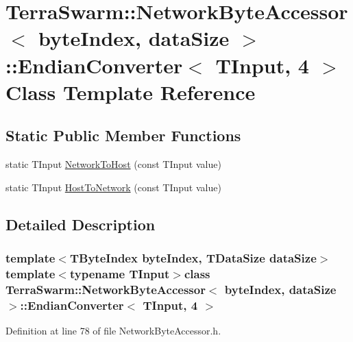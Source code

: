 \hypertarget{class_terra_swarm_1_1_network_byte_accessor_1_1_endian_converter_3_01_t_input_00_014_01_4}{\section{Terra\-Swarm\-:\-:Network\-Byte\-Accessor$<$ byte\-Index, data\-Size $>$\-:\-:Endian\-Converter$<$ T\-Input, 4 $>$ Class Template Reference}
\label{class_terra_swarm_1_1_network_byte_accessor_1_1_endian_converter_3_01_t_input_00_014_01_4}
}
\subsection*{Static Public Member Functions}
\begin{DoxyCompactItemize}
\item 
static T\-Input \hyperlink{class_terra_swarm_1_1_network_byte_accessor_1_1_endian_converter_3_01_t_input_00_014_01_4_a542049145a0bcbc72d993b62b196ad7d}{Network\-To\-Host} (const T\-Input value)
\item 
static T\-Input \hyperlink{class_terra_swarm_1_1_network_byte_accessor_1_1_endian_converter_3_01_t_input_00_014_01_4_a89edac80d0e755c13fe6b661d537a0fd}{Host\-To\-Network} (const T\-Input value)
\end{DoxyCompactItemize}


\subsection{Detailed Description}
\subsubsection*{template$<$T\-Byte\-Index byte\-Index, T\-Data\-Size data\-Size$>$template$<$typename T\-Input$>$class Terra\-Swarm\-::\-Network\-Byte\-Accessor$<$ byte\-Index, data\-Size $>$\-::\-Endian\-Converter$<$ T\-Input, 4 $>$}



Definition at line 78 of file Network\-Byte\-Accessor.\-h.




